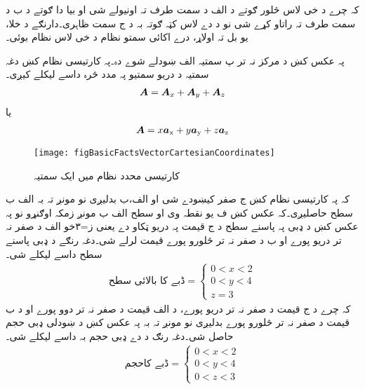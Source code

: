    کہ چرے د خی لاس څلور ګوتے د الف د سمت طرف تہ اونیولے شی او بیا دا ګوتے د ب د سمت طرف تہ راتاو کړے شی نو د دے لاس کټہ ګوتہ بہ د ج سمت ظاہری۔دارنګے د خلا، یو بل تہ اولاړ، درے اکائی سمتو نظام د خی لاس نظام بوئی۔

پہ عکس کښ د مرکز نہ تر پ سمتیہ الف ښودلے شوے دہ۔پہ کارتیسی نظام کښ دغہ سمتیہ د دریو سمتیو  پہ مدد څرہ داسے لیکلے کیږی۔
\begin{align}
{\ensuremath{{\boldsymbol{A}}}}={{\boldsymbol{A}}}_x+{{\boldsymbol{A}}}_y+{{\boldsymbol{A}}}_z
\end{align}
یا
\begin{align}
{\ensuremath{{\boldsymbol{A}}}}=x{\boldsymbol{a}}_{\textup{x}}+y{\boldsymbol{a}}_{\textup{y}}+z{\boldsymbol{a}}_{\textup{z}}
\end{align}
%
\begin{figure}
\centering
\texttt{[image: figBasicFactsVectorCartesianCoordinates]}
\caption{کارتیسی محدد نظام میں ایک سمتیہ}
\label{شکل_حقائق_کارتیسی_نظام_ایک_سمتیہ}
\end{figure}

کہ پہ کارتیسی نظام کښ ج صفر کیښودے شی او الف،ب بدلیږی نو مونږ تہ بہ الف ب سطح حاصلیږی۔کہ عکس کښ ف یو نقطہ وی او سطح الف ب مونږ زمکہ اوګنړو نو پہ عکس کښ د ډبی پہ پاسنے سطح د ج قیمت  پہ دریو ټکاو دے یعنی ز=۳خو الف د صفر نہ تر دریو پورے او ب د صفر نہ تر څلورو پورے قیمت لرلے شی۔دغہ رنګے د ډبی پاسنے سطح داسے لیکلے شی۔
\begin{align}
 \text{ڈبے کا بالائی سطح}= \left\{ 
  \begin{array}{l}
    0<x<2\\
    0<y<4 \\
	 z=3
  \end{array} \right.
\end{align}
کہ چرے د ج قیمت د صفر نہ تر دریو پورے، د الف قیمت د صفر نہ تر دوو پورے او د ب قیمت د صفر نہ تر څلورو پورے بدلیږی نو مونږ تہ بہ پہ عکس کښ د ښودلی ډبی حجم حاصل شی۔دغہ رنګ د دے ډبی حجم بہ  داسے لیکلے شی۔   
\begin{align}
 \text{ڈبے کاحجم}= \left\{ 
  \begin{array}{l}
    0<x<2\\
    0<y<4 \\
    0<z<3
  \end{array} \right.
\end{align}


